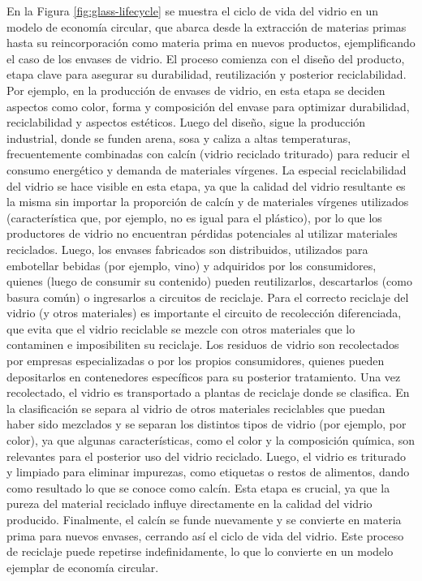 
En la Figura \ref{fig:glass-lifecycle} se muestra el ciclo de vida del vidrio en un modelo de economía circular, que abarca desde la extracción de materias primas hasta su reincorporación como materia prima en nuevos productos, ejemplificando el caso de los envases de vidrio. El proceso comienza con el diseño del producto, etapa clave para asegurar su durabilidad, reutilización y posterior reciclabilidad. Por ejemplo, en la producción de envases de vidrio, en esta etapa se deciden aspectos como color, forma y composición del envase para optimizar durabilidad, reciclabilidad y aspectos estéticos. Luego del diseño, sigue la producción industrial, donde se funden arena, sosa y caliza a altas temperaturas, frecuentemente combinadas con calcín (vidrio reciclado triturado) para reducir el consumo energético y demanda de materiales vírgenes. La especial reciclabilidad del vidrio se hace visible en esta etapa, ya que la calidad del vidrio resultante es la misma sin importar la proporción de calcín y de materiales vírgenes utilizados (característica que, por ejemplo, no es igual para el plástico), por lo que los productores de vidrio no encuentran pérdidas potenciales al utilizar materiales reciclados. Luego, los envases fabricados son distribuidos, utilizados para embotellar bebidas (por ejemplo, vino) y adquiridos por los consumidores, quienes (luego de consumir su contenido) pueden reutilizarlos, descartarlos (como basura común) o ingresarlos a circuitos de reciclaje. Para el correcto reciclaje del vidrio (y otros materiales) es importante el circuito de recolección diferenciada, que evita que el vidrio reciclable se mezcle con otros materiales que lo contaminen e imposibiliten su reciclaje. Los residuos de vidrio son recolectados por empresas especializadas o por los propios consumidores, quienes pueden depositarlos en contenedores específicos para su posterior tratamiento.
Una vez recolectado, el vidrio es transportado a plantas de reciclaje donde se clasifica. En la clasificación se separa al vidrio de otros materiales reciclables que puedan haber sido mezclados y se separan los distintos tipos de vidrio (por ejemplo, por color), ya que algunas características, como el color y la composición química, son relevantes para el posterior uso del vidrio reciclado. Luego, el vidrio es triturado y limpiado para eliminar impurezas, como etiquetas o restos de alimentos, dando como resultado lo que se conoce como calcín. Esta etapa es crucial, ya que la pureza del material reciclado influye directamente en la calidad del vidrio producido. Finalmente, el calcín se funde nuevamente y se convierte en materia prima para nuevos envases, cerrando así el ciclo de vida del vidrio. Este proceso de reciclaje puede repetirse indefinidamente, lo que lo convierte en un modelo ejemplar de economía circular.

